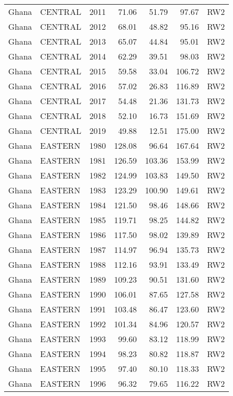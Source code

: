 \begin{longtable}{lllrrrl}
  Ghana & CENTRAL & 2011 & 71.06 & 51.79 & 97.67 & RW2 \\ 
  Ghana & CENTRAL & 2012 & 68.01 & 48.82 & 95.16 & RW2 \\ 
  Ghana & CENTRAL & 2013 & 65.07 & 44.84 & 95.01 & RW2 \\ 
  Ghana & CENTRAL & 2014 & 62.29 & 39.51 & 98.03 & RW2 \\ 
  Ghana & CENTRAL & 2015 & 59.58 & 33.04 & 106.72 & RW2 \\ 
  Ghana & CENTRAL & 2016 & 57.02 & 26.83 & 116.89 & RW2 \\ 
  Ghana & CENTRAL & 2017 & 54.48 & 21.36 & 131.73 & RW2 \\ 
  Ghana & CENTRAL & 2018 & 52.10 & 16.73 & 151.69 & RW2 \\ 
  Ghana & CENTRAL & 2019 & 49.88 & 12.51 & 175.00 & RW2 \\ 
  Ghana & EASTERN & 1980 & 128.08 & 96.64 & 167.64 & RW2 \\ 
  Ghana & EASTERN & 1981 & 126.59 & 103.36 & 153.99 & RW2 \\ 
  Ghana & EASTERN & 1982 & 124.99 & 103.83 & 149.50 & RW2 \\ 
  Ghana & EASTERN & 1983 & 123.29 & 100.90 & 149.61 & RW2 \\ 
  Ghana & EASTERN & 1984 & 121.50 & 98.46 & 148.66 & RW2 \\ 
  Ghana & EASTERN & 1985 & 119.71 & 98.25 & 144.82 & RW2 \\ 
  Ghana & EASTERN & 1986 & 117.50 & 98.02 & 139.89 & RW2 \\ 
  Ghana & EASTERN & 1987 & 114.97 & 96.94 & 135.73 & RW2 \\ 
  Ghana & EASTERN & 1988 & 112.16 & 93.91 & 133.49 & RW2 \\ 
  Ghana & EASTERN & 1989 & 109.23 & 90.51 & 131.60 & RW2 \\ 
  Ghana & EASTERN & 1990 & 106.01 & 87.65 & 127.58 & RW2 \\ 
  Ghana & EASTERN & 1991 & 103.48 & 86.47 & 123.60 & RW2 \\ 
  Ghana & EASTERN & 1992 & 101.34 & 84.96 & 120.57 & RW2 \\ 
  Ghana & EASTERN & 1993 & 99.60 & 83.12 & 118.99 & RW2 \\ 
  Ghana & EASTERN & 1994 & 98.23 & 80.82 & 118.87 & RW2 \\ 
  Ghana & EASTERN & 1995 & 97.40 & 80.10 & 118.33 & RW2 \\ 
  Ghana & EASTERN & 1996 & 96.32 & 79.65 & 116.22 & RW2 \\ 

\end{longtable}
